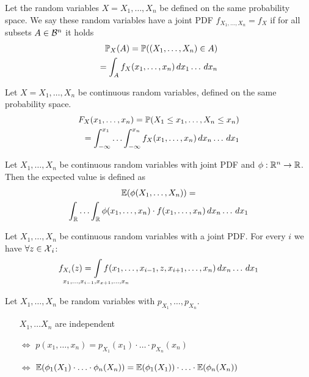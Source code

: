\pagebreak
\begin{cdefinition*}
  Let the random variables \(X = X_1, \ldots, X_n\) be defined on the same probability space. We say these random variables have a joint PDF \(f_{X_1, \ldots, X_n} = f_X\) if for all subsets \(A \in \B^n\) it holds
  \begin{align*}
    \P_X(A) = \P((X_1, \ldots, X_n) \in A) \\
    = \int_A f_X(x_1, \ldots, x_n) \, dx_1 \ldots \,dx_n
  \end{align*}
\end{cdefinition*}

\begin{cdefinition*}
  Let \(X = X_1, \ldots, X_n\) be continuous random variables, defined on the same probability space.
  \begin{align*}
    F_{X}(x_1, \ldots, x_n) = \P(X_1 \leq x_1, \ldots, X_n \leq x_n) \\
    = \int_{-\infty}^{x_1} \ldots \int_{-\infty}^{x_n} f_{X}(x_1, \ldots, x_n) \,dx_n \ldots \, dx_1
  \end{align*}
\end{cdefinition*}

\begin{proposition}
  Let \(X_1, \ldots, X_n\) be continuous random variables with joint PDF and \(\phi: \R^n \to \R\). Then the expected value is defined as
  \begin{multline*}
    \E(\phi(X_1, \ldots, X_n)) = \\ \int_\R \ldots \int_\R \phi(x_1, \ldots, x_n) \cdot f(x_1, \ldots, x_n) \, dx_n \ldots \, dx_1
  \end{multline*}
\end{proposition}

\begin{ctheorem*}
  Let \(X_1, \ldots, X_n\) be continuous random variables with a joint PDF. For every \(i\) we have \(\forall z \in \DX_i\):
  \[f_{X_i}(z) = \smashoperator{\int_{x_1, \ldots, x_{i-1}, x_{x+1}, \ldots, x_n}} f(x_1, \ldots, x_{i-1}, z, x_{i+1}, \ldots, x_n) \, dx_n \ldots \, dx_1\]
\end{ctheorem*}

\begin{theorem*}
  Let \(X_1, \ldots, X_n\) be random variables with \(p_{X_1}, \ldots, p_{X_n}\).
  \begin{itemize}
    \item[] \(X_1, \ldots X_n\) are independent
    \item[\(\Leftrightarrow\)] \(p(x_1, \ldots, x_n) = p_{X_1}(x_1) \cdot \ldots \cdot p_{X_n}(x_n)\)
    \item[\(\Leftrightarrow\)] \(\E(\phi_1(X_1) \cdot \ldots \cdot \phi_n(X_n)) = \E(\phi_1(X_1)) \cdot \ldots \cdot \E(\phi_n(X_n))\)
  \end{itemize}
\end{theorem*}

